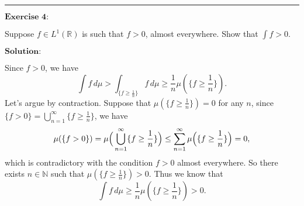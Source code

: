 \documentclass[12pt,a4paper]{ctexart}
\begin{document}
\noindent\rule[0.25\baselineskip]{\textwidth}{0.5pt}

\vspace{8pt}

$\textbf{Exercise 4:}$

Suppose $f \in L^{1}(\mathbb{R})$ is such that $f > 0$, almost everywhere. Show that $\int f > 0$.

\vspace{8pt}
$\textbf{Solution:}$

Since $f > 0$, we have
\begin{equation*}
    \int f \, d \mu > \int_{\{f \geq \frac{1}{n}\}} f \, d \mu \geq \frac{1}{n} \mu(\{f \geq \frac{1}{n}\}).
\end{equation*}
Let's argue by contraction. Suppose that $\mu(\{f \geq \frac{1}{n}\}) = 0$ for any $n$, since $\{f > 0\} = \bigcup_{n=1}^{\infty} \{f \geq \frac{1}{n}\}$, we have
\begin{equation*}
    \mu(\{f > 0\}) = \mu \Big{(} \bigcup_{n=1}^{\infty} \{f \geq \frac{1}{n}\} \Big{)} \leq \sum_{n = 1}^{\infty} \mu \Big{(} \{f \geq \frac{1}{n}\} \Big{)} = 0,
\end{equation*}
which is contradictory with the condition $f > 0$ almost everywhere. So there exists $n \in \mathbb{N}$ such that $\mu(\{f \geq \frac{1}{n}\}) > 0$. Thus we know that
\begin{equation*}
    \int f \, d \mu \geq  \frac{1}{n} \mu(\{f \geq \frac{1}{n}\}) > 0.
\end{equation*}
\end{document}
